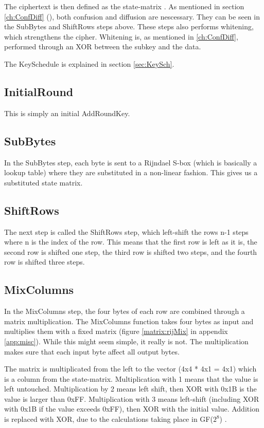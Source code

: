 The ciphertext is then defined as the state-matrix \citep[p. 103]{Stinson:2006}. 
As mentioned in section \ref{ch:ConfDiff} (), both 
confusion and diffusion are nescessary. They can be seen in the SubBytes and 
ShiftRows steps above. These steps also performs whitening, which strengthens the cipher. Whitening is, as mentioned in \ref{ch:ConfDiff}, performed through an 
XOR between the subkey and the data.

The KeySchedule is explained in section \ref{sec:KeySch}.

\subsection{InitialRound}
This is simply an initial AddRoundKey.

\subsection{SubBytes}
In the SubBytes step, each byte is sent to a Rijndael S-box (which is basically
 a lookup table) where they are substituted in a non-linear fashion. This gives 
us a substituted state matrix.

\subsection{ShiftRows}
The next step is called the ShiftRows step, which left-shift the rows n-1 
steps where n is the index of the row. This means that the first row is left 
as it is, the second row is shifted one step, the third row is shifted two 
steps, and the fourth row is shifted three steps.

\subsection{MixColumns}
In the MixColumns step, the four bytes of each row are combined through a matrix 
multiplication. The MixColumns function takes four bytes as input and multiplies 
them with a fixed matrix (figure \ref{matrix:rijMix} in appendix 
\ref{app:misc}). While this might seem simple, it really is not. The 
multiplication makes sure that each input byte affect all output bytes.
\citep{Angelfire}

The matrix is multiplicated from the left to the vector (4x4 * 4x1 = 4x1) which 
is a column from the state-matrix. Multiplication with 1 means that the value 
is left untouched. Multiplication by 2 means left shift, then XOR with 0x1B is 
the value is larger than 0xFF. Multiplication with 3 means left-shift (including 
XOR with 0x1B if the value exceeds 0xFF), then XOR with the initial value. 
Addition is replaced with XOR, due to the calculations taking place in 
GF(\(2^8\)) .

